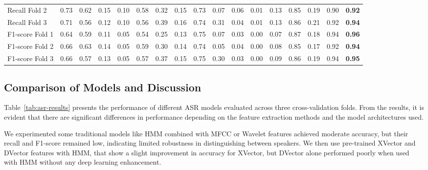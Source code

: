 \documentclass[conference]{IEEEtran}
\begin{document}
\begin{table*}[htbp]
{\begin{tabular}{|l|c|c|c|c|c|c|c|c|c|c|c|c|c|c|c|c|}
            Recall Fold 2          & 0.73     & 0.62     & 0.15        & 0.10     & 0.58     & 0.32     & 0.15        & 0.73     & 0.07      & 0.06         & 0.01      & 0.13      & 0.85          & 0.19             & 0.90          & \textbf{0.92}          \\
            Recall Fold 3          & 0.71     & 0.56     & 0.12        & 0.10     & 0.56     & 0.39     & 0.16        & 0.74     & 0.31      & 0.04         & 0.01      & 0.13      & 0.86          & 0.21             & 0.92          & \textbf{0.94}          \\
            F1-score Fold 1        & 0.64     & 0.59     & 0.11        & 0.05     & 0.54     & 0.25     & 0.13        & 0.75     & 0.07      & 0.03         & 0.00      & 0.07      & 0.87          & 0.18             & 0.94          & \textbf{0.96}          \\
            F1-score Fold 2        & 0.66     & 0.63     & 0.14        & 0.05     & 0.59     & 0.30     & 0.14        & 0.74     & 0.05      & 0.04         & 0.00      & 0.08      & 0.85          & 0.17             & 0.92          & \textbf{0.94}          \\
            F1-score Fold 3        & 0.66     & 0.57     & 0.13        & 0.05     & 0.57     & 0.37     & 0.15        & 0.75     & 0.30      & 0.03         & 0.00      & 0.09      & 0.86          & 0.19             & 0.94          & \textbf{0.95}          \\
            \hline
        \end{tabular}
    }
\end{table*}
\subsection{Comparison of Models and Discussion}

Table~\ref{tab:asr-results} presents the performance of different ASR models evaluated across three cross-validation folds. From the results, it is evident that there are significant differences in performance depending on the feature extraction methods and the model architectures used.

We experimented some traditional models like HMM combined with MFCC or Wavelet features achieved moderate accuracy, but their recall and F1-score remained low, indicating limited robustness in distinguishing between speakers. We then use pre-trained XVector and DVector features with HMM, that show a slight improvement in accuracy for XVector, but DVector alone performed poorly when used with HMM without any deep learning enhancement.
\end{document}
